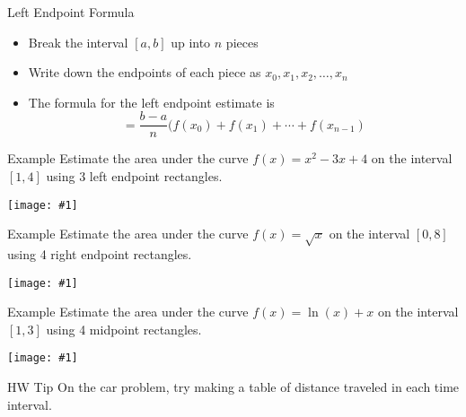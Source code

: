 \documentclass[t]{beamer}
\newcommand{\img}[1]{
\vfill
\begin{center}
\texttt{[image: \#1]}
\end{center}
\vfill
}
\begin{document}
\begin{frame}{Left Endpoint Formula}
\begin{itemize}
\item Break the interval $[a,b]$ up into $n$ pieces
\item Write down the endpoints of each piece as
$x_0, x_1, x_2, \ldots, x_n$
\item The formula for the left endpoint estimate is
$$ =  \frac{b - a}{n} (f(x_0) + f(x_1) + \cdots + f(x_{n-1})$$
\end{itemize}
\end{frame}

\begin{frame}{Example}
Estimate the area under the curve $f(x) = x^2 - 3x + 4$ on 
the interval  $[1,4]$ using 3 left endpoint rectangles.
\img{rect1}
\end{frame}

\begin{frame}{Example}
Estimate the area under the curve $f(x) = \sqrt{x}$ on 
the interval  $[0,8]$ using 4 right endpoint rectangles.
\img{rect2}
\end{frame}

\begin{frame}{Example}
Estimate the area under the curve $f(x) = \ln(x) + x$ on 
the interval  $[1,3]$ using 4 midpoint rectangles.
\img{rect3}
\end{frame}

\begin{frame}{HW Tip}
On the car problem, try making a table of distance traveled in 
each time interval.
\end{frame}
\end{document}

